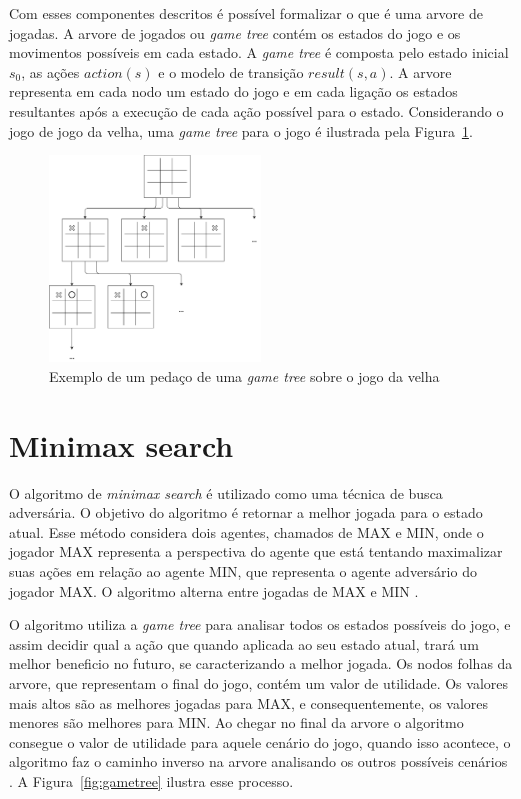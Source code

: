 Com esses componentes descritos é possível formalizar o que é uma arvore de jogadas. A arvore de jogados ou \textit{game tree} contém os estados do jogo e os movimentos possíveis em cada estado. A \textit{game tree} é composta pelo estado inicial $s_{0}$, as ações $action(s)$ e o modelo de transição $result(s, a)$. 
A arvore representa em cada nodo um estado do jogo e em cada ligação os estados resultantes após a execução de cada ação possível para o estado. Considerando o jogo de jogo da velha, uma \textit{game tree} para o jogo é ilustrada pela Figura~\ref{fig:jogodavelha}. 

\begin{figure}[ht]
	\centering
	\includegraphics[width=0.5\textwidth]{fig/jogodavelha.pdf}
	\caption{Exemplo de um pedaço de uma \textit{game tree} sobre o jogo da velha}
	\label{fig:jogodavelha}
\end{figure} 

\section{Minimax search}

O algoritmo de \textit{minimax search} é utilizado como uma técnica de busca adversária. O objetivo do algoritmo é retornar a melhor jogada para o estado atual. Esse método considera dois agentes, chamados de MAX e MIN, onde o jogador MAX representa a perspectiva do agente que está tentando maximalizar suas ações em relação ao agente MIN, que representa o agente adversário do jogador MAX. O algoritmo alterna entre jogadas de MAX e MIN \cite{intelligence2003modern}. 

O algoritmo utiliza a \textit{game tree} para analisar todos os estados possíveis do jogo, e assim decidir qual a ação que quando aplicada ao seu estado atual, trará um melhor beneficio no futuro, se caracterizando a melhor jogada. Os nodos folhas da arvore, que representam o final do jogo, contém um valor de utilidade. Os valores mais altos são as melhores jogadas para MAX, e consequentemente, os valores menores são melhores para MIN. Ao chegar no final da arvore o algoritmo consegue o valor de utilidade para aquele cenário do jogo, quando isso acontece, o algoritmo faz o caminho inverso na arvore analisando os outros possíveis cenários \cite{intelligence2003modern}. A Figura~\ref{fig:gametree} ilustra esse processo.

